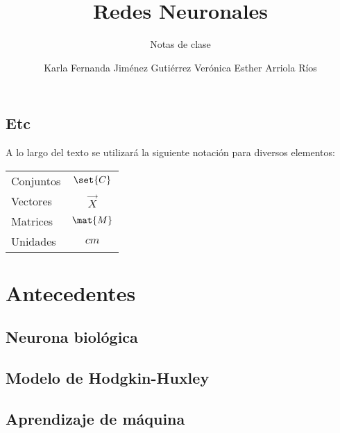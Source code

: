\documentclass[12pt,openany]{book}
\title{Redes Neuronales}
\subtitle{Notas de clase}
\author{Karla Fernanda Jiménez Gutiérrez\newline
        Verónica Esther Arriola Ríos}
\begin{document}
\maketitle

\frontmatter %
\tableofcontents
\clearemptydoublepage %


\mainmatter  %


\chapter*{Etc}

A lo largo del texto se utilizará la siguiente notación para diversos elementos:
\begin{longtable}{lc}
 Conjuntos   &   $\set{C}$ \\
 Vectores    &   $\vec{X}$ \\
 Matrices    &   $\mat{M}$ \\
 Unidades    &   $\unit{cm}$
\end{longtable}



\part{Antecedentes}
\chapter{Neurona biológica}




\chapter{Modelo de Hodgkin-Huxley}


\chapter{Aprendizaje de máquina}



\end{document}
